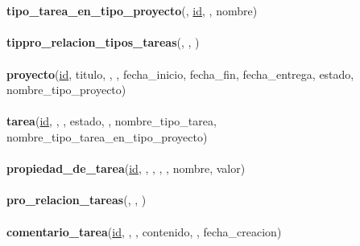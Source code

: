 \documentclass[a4paper, 12pt,twoside]{report}  %
\numberwithin{equation}{subsection} %
\begin{document}
\\\\
\textbf{tipo\_tarea\_en\_tipo\_proyecto}(\underline{}, \underline{id}, , nombre)
\\\\
\textbf{tippro\_relacion\_tipos\_tareas}(\underline{}, \underline{}, \underline{})
\\\\
\textbf{proyecto}(\underline{id}, titulo, , , fecha\_inicio, fecha\_fin, fecha\_entrega, estado, nombre\_tipo\_proyecto)
\\\\
\textbf{tarea}(\underline{id}, \underline{}, , estado, , nombre\_tipo\_tarea,\\ nombre\_tipo\_tarea\_en\_tipo\_proyecto)
\\\\
\textbf{propiedad\_de\_tarea}(\underline{id}, \underline{}, \underline{}, , , nombre, valor)
\\\\
\textbf{pro\_relacion\_tareas}(\underline{}, \underline{}, \underline{})
\\\\
\textbf{comentario\_tarea}(\underline{id}, \underline{}, \underline{}, contenido, , fecha\_creacion)
\pagebreak
\end{document}
